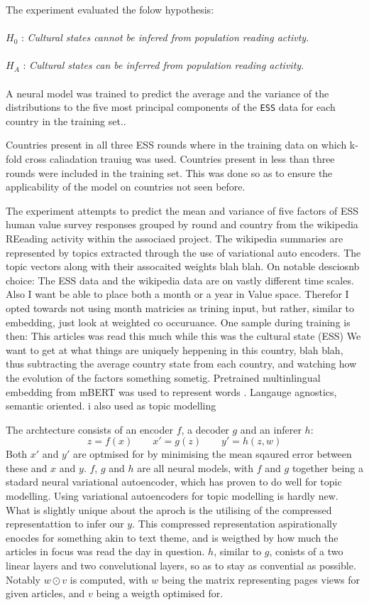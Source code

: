 The experiment evaluated the folow hypothesis:
\\
\\
$H_0$ : \emph{Cultural states cannot be infered from population reading activty.}
\\
\\
$H_A$ : \emph{Cultural states can be inferred from population reading activity.}
\\
\\
A neural model was trained to predict the average and the variance of the distributions to the five most principal components of the \texttt{ESS} data for each country in the training set..

Countries present in all three ESS rounds where in the training data on which k-fold cross caliadation trauiug was used.
Countries present in less than three rounds were included in the training set. This was done so as to
ensure the applicability of the model on countries not seen before.

The experiment attempts to predict the mean and variance of five factors of ESS human value survey responses grouped by round and country from the wikipedia REeading activity within the associaed project.
The wikipedia summaries are represented by topics extracted through the use of variational auto encoders. The topic vectors along with their assocaited weights blah blah.
On notable desciosnb choice: The ESS data and the wikipedia data are on vastly different time scales. Also I want be able to place both a month or a year in Value space. Therefor I opted towards not using month matricies as trining input, but rather, similar to embedding, just look at weighted co occuruance. One sample during training is then: This articles was read this much while this was the cultural state (ESS)
We want to get at what things are uniquely heppening in this country, blah blah, thus subtracting the average country state from each country, and watching how the evolution of the factors something sometig.
Pretrained multinlingual embedding from mBERT was used to represent words \cite{artetxe-etal-2017-learning}. Langauge agnostics, semantic oriented.
\cite{kingma2013auto} i also used as topic modelling
\cite{DBLP:journals/corr/abs-1810-04805}
\cite{Wu2020}

The archtecture consists of an encoder $f$, a decoder $g$ and an inferer $h$:
$$
z  = f(x) \qquad
x' = g(z) \qquad
y' = h(z, w)
$$
Both $x'$ and $y'$ are optmised for by minimising the mean sqaured error between these and $x$ and $y$.
$f$, $g$ and $h$ are all neural models, with $f$ and $g$ together being a stadard neural variational autoencoder, which has proven to do well for topic modelling.
Using variational autoencoders for topic modelling is hardly new. What is slightly unique about the aproch is the utilising of the compressed representattion to infer our $y$.
This compressed representation aspirationally enocdes for something akin to text theme, and is weigthed by how much the articles in focus was read the day in question.
$h$, similar to $g$, conists of a two linear layers and two convelutional layers, so as to stay as convential as possible.
Notably $w \odot v$ is computed, with $w$ being the matrix representing pages views for given articles, and $v$ being a weigth optimised for.

